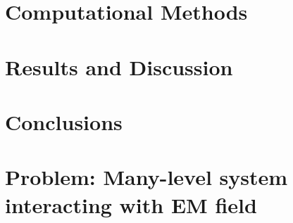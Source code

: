 \documentclass[%
 reprint,
 amsmath,amssymb,
 aps,
]{revtex4-2}
\begin{document}
\section{Computational Methods} %

\section{Results and Discussion} %

\section{Conclusions} %

\section{\label{sec:level1}Problem: Many-level system interacting with EM field}
\end{document}
